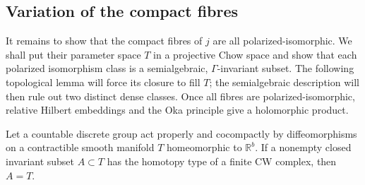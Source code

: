 \subsection{Variation of the compact fibres}

It remains to show that the compact fibres of $j$ are all polarized-isomorphic.  We shall put their parameter space $T$ in a projective Chow space and show that each polarized isomorphism class is a semialgebraic, $\Gamma$-invariant subset.  The following topological lemma will force its closure to fill $T$; the semialgebraic description will then rule out two distinct dense classes.  Once all fibres are polarized-isomorphic, relative Hilbert embeddings and the Oka principle give a holomorphic product.

\begin{lemma}
\label{lem:cmp-closed-rigidity}
Let a countable discrete group act properly and cocompactly by diffeomorphisms on a contractible smooth manifold $T$ homeomorphic to $\mathbb{R}^b$.  If a nonempty closed invariant subset $A\subset T$ has the homotopy type of a finite CW complex, then $A=T$.
\end{lemma}

